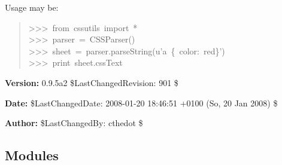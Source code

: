 Usage may be:
\begin{quote}{\ttfamily \raggedright \noindent
>{}>{}>~from~cssutils~import~*~\\
>{}>{}>~parser~=~CSSParser()~\\
>{}>{}>~sheet~=~parser.parseString(u'a~{\{}~color:~red{\}}')~\\
>{}>{}>~print~sheet.cssText
}\end{quote}
\textbf{Version:} 0.9.5a2 \$LastChangedRevision: 901 \$



\textbf{Date:} \$LastChangedDate: 2008-01-20 18:46:51 +0100 (So, 20 Jan 2008) \$



\textbf{Author:} \$LastChangedBy: cthedot \$





\subsection{Modules}

